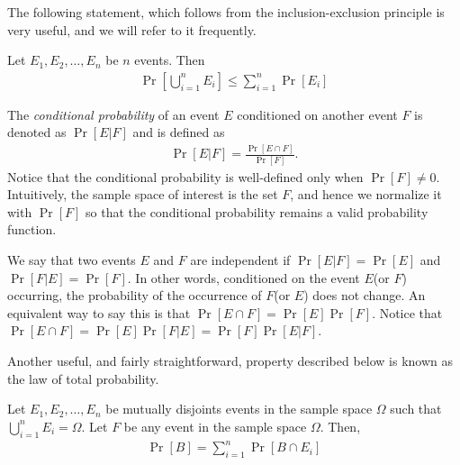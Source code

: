 The following statement, which follows from the inclusion-exclusion principle is very useful, and we will refer to it frequently.

\begin{fact}
	Let $E_1, E_2, \ldots, E_n$ be $n$ events. Then
	\begin{align*}
		\Pr\left[\bigcup_{i=1}^n E_i\right] \leq \sum_{i=1}^n \Pr[E_i]
	\end{align*}
\end{fact}

The \emph{conditional probability} of an event $E$ conditioned on another event
$F$ is denoted as $\Pr[E | F]$ and is defined as
\begin{align*}
	\Pr[E|F] = \frac{\Pr[E\cap F]}{\Pr[F]}.
\end{align*}
Notice that the conditional probability is well-defined only when
$\Pr[F] \neq 0$. Intuitively, the sample space of interest is the set $F$, and
hence we normalize it with $\Pr[F]$ so that the conditional probability remains
a valid probability function.

We say that two events $E$ and $F$ are independent if $\Pr[E|F] = \Pr[E]$ and
$\Pr[F|E] = \Pr[F]$. In other words, conditioned on the event $E$(or $F$)
occurring, the probability of the occurrence of $F$(or $E$) does not change. An
equivalent way to say this is that $\Pr[E\cap F] = \Pr[E]\Pr[F]$. Notice that
$\Pr[E\cap F] = \Pr[E]\Pr[F|E] = \Pr[F]\Pr[E|F]$.

Another useful, and fairly straightforward, property described below is known as
the law of total probability.

\begin{theorem}
	Let $E_1, E_2, \ldots, E_n$ be mutually disjoints events in the sample
        space $\Omega$ such that $\bigcup_{i=1}^n E_i = \Omega$. Let $F$ be any
        event in the sample space $\Omega$. Then,
	\begin{align*}
		\Pr[B] = \sum_{i=1}^n \Pr[B \cap E_i]
	\end{align*}
	\label{thm:tot-prob}
\end{theorem}

